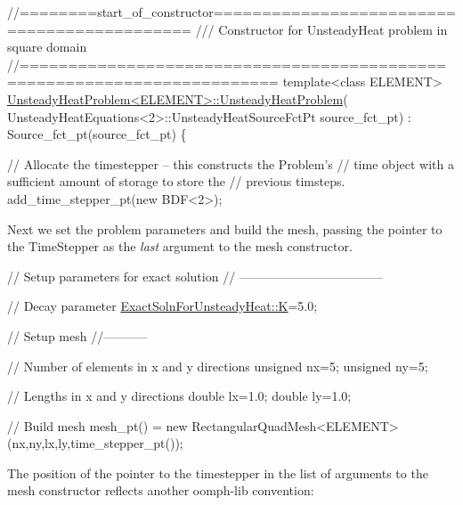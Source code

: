  
\begin{DoxyCodeInclude}
\textcolor{comment}{//========start\_of\_constructor============================================}
\textcolor{comment}{/// Constructor for UnsteadyHeat problem in square domain}
\textcolor{comment}{}\textcolor{comment}{//========================================================================}
\textcolor{keyword}{template}<\textcolor{keyword}{class} ELEMENT>
\hyperlink{classUnsteadyHeatProblem_abd3a46eea132b1e5872be6a6309a51b2}{UnsteadyHeatProblem<ELEMENT>::UnsteadyHeatProblem}(
 UnsteadyHeatEquations<2>::UnsteadyHeatSourceFctPt source\_fct\_pt) : 
 Source\_fct\_pt(source\_fct\_pt)
\{ 

 \textcolor{comment}{// Allocate the timestepper -- this constructs the Problem's }
 \textcolor{comment}{// time object with a sufficient amount of storage to store the}
 \textcolor{comment}{// previous timsteps. }
 add\_time\_stepper\_pt(\textcolor{keyword}{new} BDF<2>);

\end{DoxyCodeInclude}


Next we set the problem parameters and build the mesh, passing the pointer to the {\ttfamily Time\+Stepper} as the {\itshape last} argument to the mesh constructor.


\begin{DoxyCodeInclude}
 \textcolor{comment}{// Setup parameters for exact solution}
 \textcolor{comment}{// -----------------------------------}

 \textcolor{comment}{// Decay parameter}
 \hyperlink{namespaceExactSolnForUnsteadyHeat_a20d04bcf14546becd4bcdf45446be756}{ExactSolnForUnsteadyHeat::K}=5.0;

 \textcolor{comment}{// Setup mesh}
 \textcolor{comment}{//-----------}

 \textcolor{comment}{// Number of elements in x and y directions}
 \textcolor{keywordtype}{unsigned} nx=5;
 \textcolor{keywordtype}{unsigned} ny=5;

 \textcolor{comment}{// Lengths in x and y directions}
 \textcolor{keywordtype}{double} lx=1.0;
 \textcolor{keywordtype}{double} ly=1.0;

 \textcolor{comment}{// Build mesh}
 mesh\_pt() = \textcolor{keyword}{new} RectangularQuadMesh<ELEMENT>(nx,ny,lx,ly,time\_stepper\_pt());

\end{DoxyCodeInclude}


The position of the pointer to the timestepper in the list of arguments to the mesh constructor reflects another {\ttfamily oomph-\/lib} convention\+:


